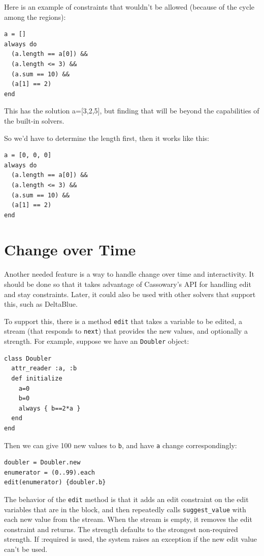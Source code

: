 \documentclass[11pt]{article}
\begin{document}
Here is an example of constraints that wouldn't be allowed (because of
the cycle among the regions):

\begin{lstlisting}
a = []
always do
  (a.length == a[0]) &&
  (a.length <= 3) &&
  (a.sum == 10) &&
  (a[1] == 2)
end
\end{lstlisting}

This has the solution a=[3,2,5], but finding that will be beyond
the capabilities of the built-in solvers.

So we'd have to determine the length first, then it works like this:
\begin{lstlisting}
a = [0, 0, 0]
always do
  (a.length == a[0]) &&
  (a.length <= 3) &&
  (a.sum == 10) &&
  (a[1] == 2)
end
\end{lstlisting}

\section{Change over Time}
\label{sec:change-over-time}

Another needed feature is a way to handle change over time and
interactivity.  It should be done so that it takes advantage of
Cassowary's API for handling edit and stay constraints.  Later, it
could also be used with other solvers that support this, such as
DeltaBlue.

To support this, there is a method \lstinline{edit} that takes a
variable to be edited, a stream (that responds to \lstinline{next})
that provides the new values, and optionally a strength.  For example,
suppose we have an \lstinline{Doubler} object:

\begin{lstlisting}
class Doubler
  attr_reader :a, :b
  def initialize
    a=0
    b=0
    always { b==2*a }
  end
end  
\end{lstlisting}

Then we can give 100 new values to \lstinline{b}, and have
\lstinline{a} change correspondingly:

\begin{lstlisting}
doubler = Doubler.new
enumerator = (0..99).each
edit(enumerator) {doubler.b}
\end{lstlisting}

The behavior of the \lstinline{edit} method is that it adds an edit
constraint on the edit variables that are in the block, and then
repeatedly calls \lstinline{suggest_value} with each new value from
the stream.  When the stream is empty, it removes the edit constraint
and returns.  The strength defaults to the strongest non-required
strength.  If :required is used, the system raises an exception if the
new edit value can't be used.
\end{document}
